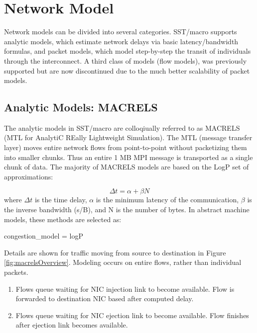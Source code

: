 
\section{Network Model}
\label{sec:tutorial:networkmodel}

Network models can be divided into several categories.  SST/macro supports analytic models, which estimate network delays via basic latency/bandwidth formulas, and packet models, which model step-by-step the transit of individuals through the interconnect.
A third class of models (flow models), was previously supported but are now discontinued due to the much better scalability of packet models.

\subsection{Analytic Models: MACRELS}
\label{subsec:tutorial:macrels}

The analytic models in SST/macro are colloqiually referred to as MACRELS (MTL for AnalytiC REally Lightweight Simulation).
The MTL (message transfer layer) moves entire network flows from point-to-point without packetizing them into smaller chunks.
Thus an entire 1 MB MPI message is transported as a single chunk of data.  
The majority of MACRELS models are based on the LogP set of approximations:

\[
\Delta t = \alpha + \beta N
\]
where $\Delta t$ is the time delay, $\alpha$ is the minimum latency of the communication, $\beta$ is the inverse bandwidth (s/B), and N is the number of bytes.
In abstract machine models, these methods are selected as:

\begin{ViFile}
congestion_model = logP
\end{ViFile}
Details are shown for traffic moving from source to destination in Figure \ref{fig:macrelsOverview}.
Modeling occurs on entire flows, rather than individual packets. 

\begin{enumerate}
\item Flows queue waiting for NIC injection link to become available. Flow is forwarded to destination NIC based after computed delay. 
\item Flows queue waiting for NIC ejection link to become available. Flow finishes after ejection link becomes available.
\end{enumerate}

